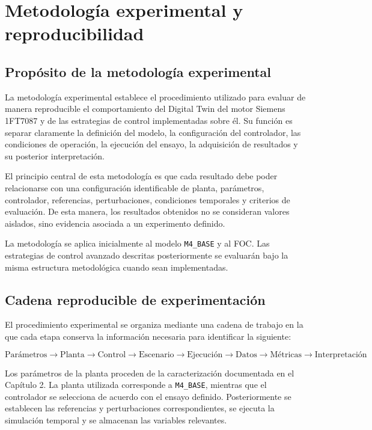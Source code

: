 \section{Metodología experimental y reproducibilidad}

\subsection{Propósito de la metodología experimental}

La metodología experimental establece el procedimiento utilizado para evaluar de manera reproducible el comportamiento del Digital Twin del motor Siemens 1FT7087 y de las estrategias de control implementadas sobre él. Su función es separar claramente la definición del modelo, la configuración del controlador, las condiciones de operación, la ejecución del ensayo, la adquisición de resultados y su posterior interpretación.

El principio central de esta metodología es que cada resultado debe poder relacionarse con una configuración identificable de planta, parámetros, controlador, referencias, perturbaciones, condiciones temporales y criterios de evaluación. De esta manera, los resultados obtenidos no se consideran valores aislados, sino evidencia asociada a un experimento definido.

La metodología se aplica inicialmente al modelo \texttt{M4\_BASE} y al FOC. Las estrategias de control avanzado descritas posteriormente se evaluarán bajo la misma estructura metodológica cuando sean implementadas.

\subsection{Cadena reproducible de experimentación}

El procedimiento experimental se organiza mediante una cadena de trabajo en la que cada etapa conserva la información necesaria para identificar la siguiente:

\begin{equation}
\text{Parámetros}
\rightarrow
\text{Planta}
\rightarrow
\text{Control}
\rightarrow
\text{Escenario}
\rightarrow
\text{Ejecución}
\rightarrow
\text{Datos}
\rightarrow
\text{Métricas}
\rightarrow
\text{Interpretación}
\end{equation}

Los parámetros de la planta proceden de la caracterización documentada en el Capítulo 2. La planta utilizada corresponde a \texttt{M4\_BASE}, mientras que el controlador se selecciona de acuerdo con el ensayo definido. Posteriormente se establecen las referencias y perturbaciones correspondientes, se ejecuta la simulación temporal y se almacenan las variables relevantes.

